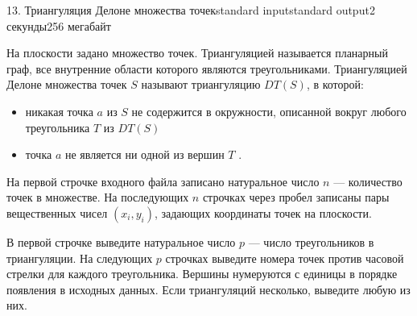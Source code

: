 \begin{problem}{13. Триангуляция Делоне множества точек}{standard input}{standard output}{2 секунды}{256 мегабайт}

На плоскости задано множество точек. Триангуляцией называется планарный граф, все внутренние области которого являются треугольниками. Триангуляцией Делоне множества точек $S$ называют триангуляцию $DT(S)$, в которой:
\begin{itemize}
\item никакая точка $a$ из $S$ не содержится в окружности, описанной вокруг любого треугольника $T$ из $DT(S)$
\item точка $a$ не является ни одной из вершин $T$ .
\end{itemize}

\InputFile

На первой строчке входного файла записано натуральное число $n$ --- количество точек в множестве. На последующих $n$ строчках через пробел записаны пары вещественных чисел $(x_i, y_i)$, задающих координаты точек на плоскости.

\OutputFile

В первой строчке выведите натуральное число $p$ --- число треугольников в триангуляции. На следующих $p$ строчках выведите номера точек против часовой стрелки для каждого треугольника.
Вершины нумеруются с единицы в порядке появления в исходных данных. Если триангуляций несколько, выведите любую из них.

\Examples

\begin{example}%
%
%
\end{example}

\end{problem}